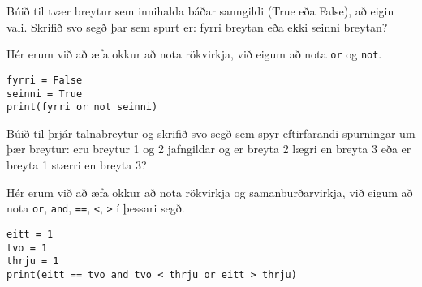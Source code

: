 \begin{exercise}\label{exp2}
Búið til tvær breytur sem innihalda báðar sanngildi (True eða False), að eigin vali.
Skrifið svo segð þar sem spurt er: fyrri breytan eða ekki seinni breytan?
\end{exercise}
\begin{Answer}[ref={exp2}]
Hér erum við að æfa okkur að nota rökvirkja, við eigum að nota \texttt{or} og \texttt{not}.
	\begin{lstlisting}
fyrri = False
seinni = True
print(fyrri or not seinni)\end{lstlisting}
\end{Answer}

\begin{exercise}\label{exp3}
Búið til þrjár talnabreytur og skrifið svo segð sem spyr eftirfarandi spurningar um þær breytur: eru breytur 1 og 2 jafngildar og er breyta 2 lægri en breyta 3 eða er breyta 1 stærri en breyta 3?
\end{exercise}
\begin{Answer}[ref={exp3}]
	Hér erum við að æfa okkur að nota rökvirkja og samanburðarvirkja, við eigum að nota \texttt{or}, \texttt{and}, \texttt{==}, \texttt{<}, \texttt{>} í þessari segð.
	\begin{lstlisting}
eitt = 1
tvo = 1
thrju = 1
print(eitt == tvo and tvo < thrju or eitt > thrju)\end{lstlisting}
\newpage
\end{Answer}

